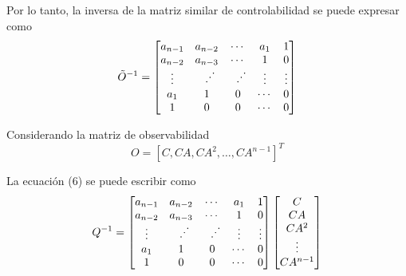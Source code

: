 Por lo tanto, la inversa de la matriz similar de controlabilidad se puede expresar como 
\[
    \tilde{O}^{-1} = 
    \begin{bmatrix}
        a_{n-1} & a_{n-2} & \cdots & a_{1} & 1 \\
        a_{n-2} & a_{n-3} & \cdots & 1 & 0 \\
        \vdots & \rotatebox{90}{\(\ddots\)} & \rotatebox{90}{\(\ddots\)} & \vdots & \vdots \\
        a_{1} & 1 & 0 & \cdots & 0 \\
        1 & 0 & 0 & \cdots & 0
    \end{bmatrix}
\]

Considerando la matriz de observabilidad 
\[
    O = [C, CA, CA^{2}, \ldots, CA^{n-1}]^{T}
\]

La ecuación (6) se puede escribir como
\[
    Q^{-1} =
    \begin{bmatrix}
    a_{n-1} & a_{n-2} & \cdots & a_{1} & 1 \\
    a_{n-2} & a_{n-3} & \cdots & 1 & 0 \\
    \vdots & \rotatebox{90}{\(\ddots\)} & \rotatebox{90}{\(\ddots\)} & \vdots & \vdots \\
    a_{1} & 1 & 0 & \cdots & 0 \\
    1 & 0 & 0 & \cdots & 0
    \end{bmatrix}
    \begin{bmatrix}
        C \\
        CA \\
        CA^{2} \\
        \vdots \\
        CA^{n-1}
    \end{bmatrix}
\]